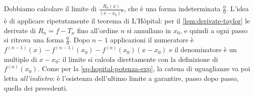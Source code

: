 \begin{schema}
\end{schema}

\begin{strategia}
Dobbiamo calcolare il limite di $\frac{R_{n}(x)}{(x-x_{0})^{n}}$, che è una forma
indeterminata $\frac00$. L'idea è di applicare ripetutamente il teorema di L'Hôpital:
per il \cref{lem:derivate-taylor} le derivate di $R_{n}=f-T_{n}$ fino all'ordine $n$ si
annullano in $x_{0}$, e quindi a ogni passo si ritrova una forma $\frac00$. Dopo $n-1$
applicazioni il numeratore è $f^{(n-1)}(x)-f^{(n-1)}(x_{0})-f^{(n)}(x_{0})(x-x_{0})$ e il
denominatore è un multiplo di $x-x_{0}$: il limite si calcola direttamente con la
definizione di $f^{(n)}(x_{0})$. Come per la \eqref{eq:hopital-potenza-exp}, la catena
di uguaglianze va poi letta \emph{all'indietro}: è l'esistenza dell'ultimo limite a
garantire, passo dopo passo, quella dei precedenti.
\end{strategia}

